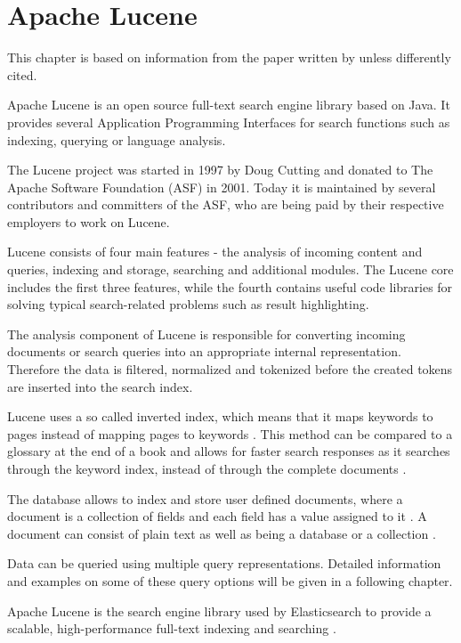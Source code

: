 \chapter{Apache Lucene}

This chapter is based on information from the paper written by \autocite{bialeckia.2012} unless differently cited.

Apache Lucene is an open source full-text search engine library based on Java. It provides several Application Programming Interfaces for search functions such as indexing, querying or language analysis. 

The Lucene project was started in 1997 by Doug Cutting and donated to The Apache Software Foundation (ASF) in 2001. Today it is maintained by several contributors and committers of the ASF, who are being paid by their respective employers to work on Lucene.

Lucene consists of four main features - the analysis of incoming content and queries, indexing and storage, searching and additional modules. The Lucene core includes the first three features, while the fourth contains useful code libraries for solving typical search-related problems such as result highlighting.

The analysis component of Lucene is responsible for converting incoming documents or search queries into an appropriate internal representation. Therefore the data is filtered, normalized and tokenized before the created tokens are inserted into the search index. 

Lucene uses a so called inverted index, which means that it maps keywords to pages instead of mapping pages to keywords \autocite{baeldung2018}. This method can be compared to a glossary at the end of a book and allows for faster search responses as it searches through the keyword index, instead of through the complete documents \autocite{baeldung2018}. 

The database allows to index and store user defined documents, where a document is a collection of fields and each field has a value assigned to it \autocite{baeldung2018}. A document can consist of plain text as well as being a database or a collection \autocite{baeldung2018}. 

Data can be queried using multiple query representations. Detailed information and examples on some of these query options will be given in a following chapter.    

Apache Lucene is the search engine library used by Elasticsearch to provide a scalable, high-performance full-text indexing and searching \autocite{tank.2019}.
